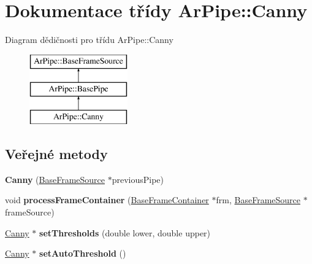 \hypertarget{class_ar_pipe_1_1_canny}{\section{Dokumentace třídy Ar\-Pipe\-:\-:Canny}
\label{d0/d36/class_ar_pipe_1_1_canny}
}
Diagram dědičnosti pro třídu Ar\-Pipe\-:\-:Canny\begin{figure}[H]
\begin{center}
\leavevmode
\includegraphics[height=3.000000cm]{d0/d36/class_ar_pipe_1_1_canny}
\end{center}
\end{figure}
\subsection*{Veřejné metody}
\begin{DoxyCompactItemize}
\item 
\hypertarget{class_ar_pipe_1_1_canny_aa806eb626a041a543c850b9755697717}{{\bfseries Canny} (\hyperlink{class_ar_pipe_1_1_base_frame_source}{Base\-Frame\-Source} $\ast$previous\-Pipe)}\label{d0/d36/class_ar_pipe_1_1_canny_aa806eb626a041a543c850b9755697717}

\item 
\hypertarget{class_ar_pipe_1_1_canny_a4579563ce17fcbfae02d4faa8a21ea64}{void {\bfseries process\-Frame\-Container} (\hyperlink{class_ar_pipe_1_1_base_frame_container}{Base\-Frame\-Container} $\ast$frm, \hyperlink{class_ar_pipe_1_1_base_frame_source}{Base\-Frame\-Source} $\ast$frame\-Source)}\label{d0/d36/class_ar_pipe_1_1_canny_a4579563ce17fcbfae02d4faa8a21ea64}

\item 
\hypertarget{class_ar_pipe_1_1_canny_ae515215ec103b8439489dde98aa11199}{\hyperlink{class_ar_pipe_1_1_canny}{Canny} $\ast$ {\bfseries set\-Thresholds} (double lower, double upper)}\label{d0/d36/class_ar_pipe_1_1_canny_ae515215ec103b8439489dde98aa11199}

\item 
\hypertarget{class_ar_pipe_1_1_canny_a7a2bd70d7401d8e8ca78ca6084d18ae2}{\hyperlink{class_ar_pipe_1_1_canny}{Canny} $\ast$ {\bfseries set\-Auto\-Threshold} ()}\label{d0/d36/class_ar_pipe_1_1_canny_a7a2bd70d7401d8e8ca78ca6084d18ae2}

\end{DoxyCompactItemize}
